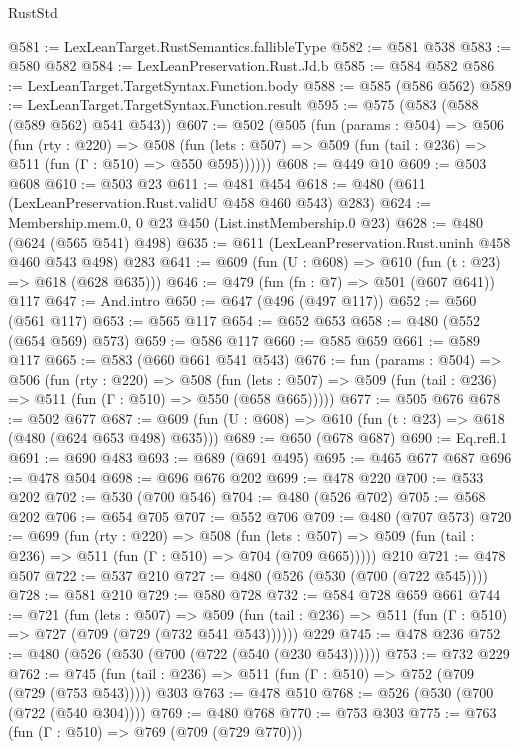 \begin{lexlean}{RustStd}
\begin{coremodule}
{\begin{coremodule}
{{{{{{{{{@581 := LexLeanTarget.RustSemantics.fallibleType
@582 := @581 @538
@583 := @580 @582
@584 := LexLeanPreservation.Rust.Jd.b
@585 := @584 @582
@586 := LexLeanTarget.TargetSyntax.Function.body
@588 := @585 (@586 @562)
@589 := LexLeanTarget.TargetSyntax.Function.result
@595 := @575 (@583 (@588 (@589 @562) @541 @543))
@607 := @502
    (@505
      (fun (params : @504) =>
      @506
        (fun (rty : @220) =>
        @508
          (fun (lets : @507) => @509 (fun (tail : @236) => @511 (fun (Γ : @510) => @550 @595))))))
@608 := @449 @10
@609 := @503 @608
@610 := @503 @23
@611 := @481 @454
@618 := @480 (@611 (LexLeanPreservation.Rust.validU @458 @460 @543) @283)
@624 := Membership.mem.{0, 0} @23 @450 (List.instMembership.{0} @23)
@628 := @480 (@624 (@565 @541) @498)
@635 := @611 (LexLeanPreservation.Rust.uninh @458 @460 @543 @498) @283
@641 := @609 (fun (U : @608) => @610 (fun (t : @23) => @618 (@628 @635)))
@646 := @479 (fun (fn : @7) => @501 (@607 @641)) @117
@647 := And.intro
@650 := @647 (@496 (@497 @117))
@652 := @560 (@561 @117)
@653 := @565 @117
@654 := @652 @653
@658 := @480 (@552 (@654 @569) @573)
@659 := @586 @117
@660 := @585 @659
@661 := @589 @117
@665 := @583 (@660 @661 @541 @543)
@676 := fun (params : @504) =>
  @506
    (fun (rty : @220) =>
    @508
      (fun (lets : @507) => @509 (fun (tail : @236) => @511 (fun (Γ : @510) => @550 (@658 @665)))))
@677 := @505 @676
@678 := @502 @677
@687 := @609 (fun (U : @608) => @610 (fun (t : @23) => @618 (@480 (@624 @653 @498) @635)))
@689 := @650 (@678 @687)
@690 := Eq.refl.{1}
@691 := @690 @483
@693 := @689 (@691 @495)
@695 := @465 @677 @687
@696 := @478 @504
@698 := @696 @676 @202
@699 := @478 @220
@700 := @533 @202
@702 := @530 (@700 @546)
@704 := @480 (@526 @702)
@705 := @568 @202
@706 := @654 @705
@707 := @552 @706
@709 := @480 (@707 @573)
@720 := @699
    (fun (rty : @220) =>
    @508
      (fun (lets : @507) => @509 (fun (tail : @236) => @511 (fun (Γ : @510) => @704 (@709 @665)))))
    @210
@721 := @478 @507
@722 := @537 @210
@727 := @480 (@526 (@530 (@700 (@722 @545))))
@728 := @581 @210
@729 := @580 @728
@732 := @584 @728 @659 @661
@744 := @721
    (fun (lets : @507) =>
    @509 (fun (tail : @236) => @511 (fun (Γ : @510) => @727 (@709 (@729 (@732 @541 @543))))))
    @229
@745 := @478 @236
@752 := @480 (@526 (@530 (@700 (@722 (@540 (@230 @543))))))
@753 := @732 @229
@762 := @745 (fun (tail : @236) => @511 (fun (Γ : @510) => @752 (@709 (@729 (@753 @543))))) @303
@763 := @478 @510
@768 := @526 (@530 (@700 (@722 (@540 @304))))
@769 := @480 @768
@770 := @753 @303
@775 := @763 (fun (Γ : @510) => @769 (@709 (@729 @770)))
}}}}}}}}}
\end{coremodule}}
\end{coremodule}
\end{lexlean}
